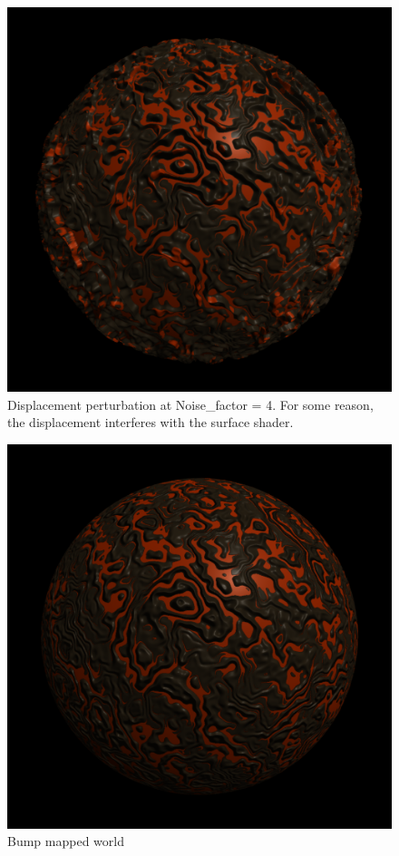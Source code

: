 \documentclass[12pt,letterpaper]{article}
\begin{document}
\begin{figure}[!h]
    \centering
    \includegraphics[width=1.0\textwidth]{img/disp_perturb.png}
    \caption{Displacement perturbation at Noise\_factor = 4. For some reason,
    the displacement interferes with the surface shader.}
\end{figure}

\begin{figure}[!h]
    \centering
    \includegraphics[width=1.0\textwidth]{img/bump.png}
    \caption{Bump mapped world}
\end{figure}
\end{document}
